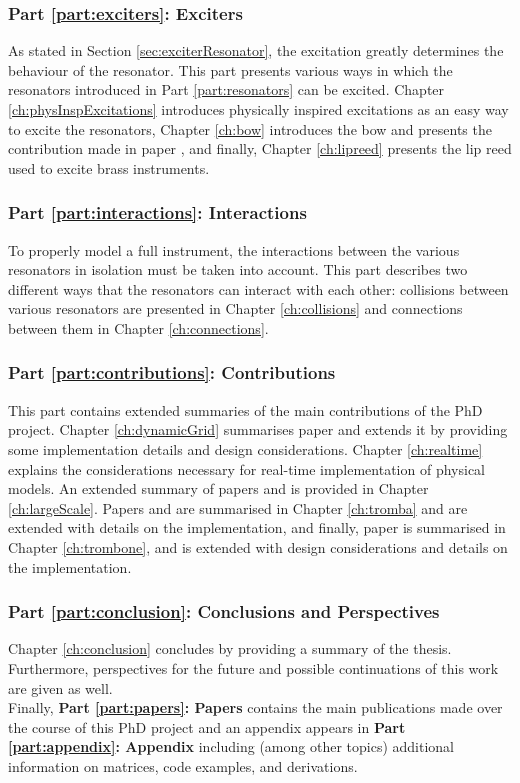 \subsubsection{Part \ref{part:exciters}: Exciters} 
As stated in Section \ref{sec:exciterResonator}, the excitation greatly determines the behaviour of the resonator. This part
presents various ways in which the resonators introduced in Part \ref{part:resonators} can be excited. Chapter \ref{ch:physInspExcitations} introduces physically inspired excitations as an easy way to excite the resonators, Chapter \ref{ch:bow} introduces the bow and presents the contribution made in paper \citeP[C], and finally, Chapter \ref{ch:lipreed} presents the lip reed used to excite brass instruments.

\subsubsection{Part \ref{part:interactions}: Interactions}
To properly model a full instrument, the interactions between the various resonators in isolation must be taken into account. This part describes two different ways that the resonators can interact with each other: collisions between various resonators are presented in Chapter \ref{ch:collisions} and connections between them in Chapter \ref{ch:connections}. 

\subsubsection{Part \ref{part:contributions}: Contributions} This part contains extended summaries of the main contributions of the PhD project. Chapter \ref{ch:dynamicGrid} summarises paper \citeP[G] and extends it by providing some implementation details and design considerations. Chapter \ref{ch:realtime} explains the considerations necessary for real-time implementation of physical models. An extended summary of papers \citeP[A] and \citeP[B] is provided in Chapter \ref{ch:largeScale}. Papers \citeP[D] and \citeP[E] are summarised in Chapter \ref{ch:tromba} and are extended with details on the implementation, and finally, paper \citeP[H] is summarised in Chapter \ref{ch:trombone}, and is extended with design considerations and details on the implementation.

\subsubsection{Part \ref{part:conclusion}: Conclusions and Perspectives}
Chapter \ref{ch:conclusion} concludes by providing a summary of the thesis. Furthermore, perspectives for the future and possible continuations of this work are given as well.
\\

\noindent Finally, \textbf{Part \ref{part:papers}: Papers} contains the main publications made over the course of this PhD project and an appendix  appears in \textbf{Part \ref{part:appendix}: Appendix} including (among other topics) additional information on matrices, code examples, and derivations.